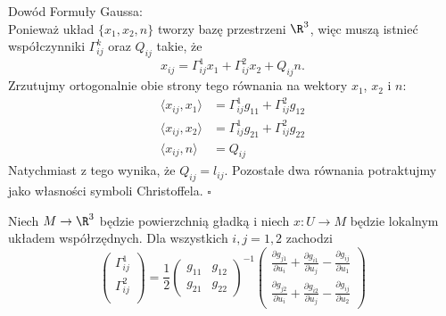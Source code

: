 \begin{frame}
\textcolor{ared}{Dowód Formuły Gaussa:}\\\pause
Ponieważ układ $\{x_1, x_2, n\}$ tworzy bazę przestrzeni $\R^3$, więc muszą istnieć współczynniki $\Gamma^k_{ij}$ oraz $Q_{ij}$ takie, że \[x_{ij}=\Gamma^1_{ij}x_1+\Gamma^2_{ij}x_2+Q_{ij}n.\]\pause
Zrzutujmy ortogonalnie obie strony tego równania na wektory $x_1$, $x_2$ i $n$:
\begin{align*}
\langle x_{ij},x_1 \rangle&=\Gamma^1_{ij}g_{11}+\Gamma^2_{ij}g_{12}\\
\langle x_{ij}, x_2\rangle&=\Gamma^1_{ij}g_{21}+\Gamma^2_{ij}g_{22}\\
\langle x_{ij}, n\rangle&=Q_{ij}
\end{align*}
\pause Natychmiast z tego wynika, że $Q_{ij}=l_{ij}$. Pozostałe dwa równania potraktujmy jako własności symboli Christoffela.
\hfill $\square$
\end{frame}
\begin{frame}[<+->]
\begin{lemat}\label{lem:christoffel-prop}
Niech $M\to \R^3$ będzie powierzchnią gładką i niech $x\colon U\to M$ będzie lokalnym układem współrzędnych. Dla wszystkich $i, j=1,2$ zachodzi
\[
\left(
\begin{array}{c}
\Gamma^1_{ij}\\
\Gamma^2_{ij}\\
\end{array}
\right)
=\frac{1}{2}\left(
\begin{array}{cc}
g_{11} & g_{12}\\
g_{21} & g_{22}
\end{array}
\right)^{-1}
\left(
\begin{array}{c}
\frac{\partial g_{j1}}{\partial u_i}+\frac{\partial g_{i1}}{\partial u_j}-\frac{\partial g_{ij}}{\partial u_1}\\
\frac{\partial g_{j2}}{\partial u_i}+\frac{\partial g_{i2}}{\partial u_j}-\frac{\partial g_{ij}}{\partial u_2}
\end{array}
\right)
\]
\end{lemat}
\end{frame}
